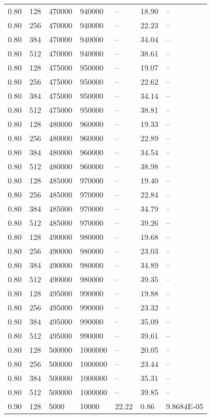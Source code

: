 \begin{tabular}{l|l|l|l|l|l|l}
0.80 & 128 & 470000 & 940000 & -- & 18.90 & --\\
0.80 & 256 & 470000 & 940000 & -- & 22.23 & --\\
0.80 & 384 & 470000 & 940000 & -- & 34.04 & --\\
0.80 & 512 & 470000 & 940000 & -- & 38.61 & --\\
0.80 & 128 & 475000 & 950000 & -- & 19.07 & --\\
0.80 & 256 & 475000 & 950000 & -- & 22.62 & --\\
0.80 & 384 & 475000 & 950000 & -- & 34.14 & --\\
0.80 & 512 & 475000 & 950000 & -- & 38.81 & --\\
0.80 & 128 & 480000 & 960000 & -- & 19.33 & --\\
0.80 & 256 & 480000 & 960000 & -- & 22.89 & --\\
0.80 & 384 & 480000 & 960000 & -- & 34.54 & --\\
0.80 & 512 & 480000 & 960000 & -- & 38.98 & --\\
0.80 & 128 & 485000 & 970000 & -- & 19.40 & --\\
0.80 & 256 & 485000 & 970000 & -- & 22.84 & --\\
0.80 & 384 & 485000 & 970000 & -- & 34.79 & --\\
0.80 & 512 & 485000 & 970000 & -- & 39.26 & --\\
0.80 & 128 & 490000 & 980000 & -- & 19.68 & --\\
0.80 & 256 & 490000 & 980000 & -- & 23.03 & --\\
0.80 & 384 & 490000 & 980000 & -- & 34.89 & --\\
0.80 & 512 & 490000 & 980000 & -- & 39.35 & --\\
0.80 & 128 & 495000 & 990000 & -- & 19.88 & --\\
0.80 & 256 & 495000 & 990000 & -- & 23.32 & --\\
0.80 & 384 & 495000 & 990000 & -- & 35.09 & --\\
0.80 & 512 & 495000 & 990000 & -- & 39.61 & --\\
0.80 & 128 & 500000 & 1000000 & -- & 20.05 & --\\
0.80 & 256 & 500000 & 1000000 & -- & 23.44 & --\\
0.80 & 384 & 500000 & 1000000 & -- & 35.31 & --\\
0.80 & 512 & 500000 & 1000000 & -- & 39.85 & --\\
\hline0.90 & 128 &   5000 &  10000 & 22.22 &  0.86 & 9.8684E-05\\

\end{tabular}
